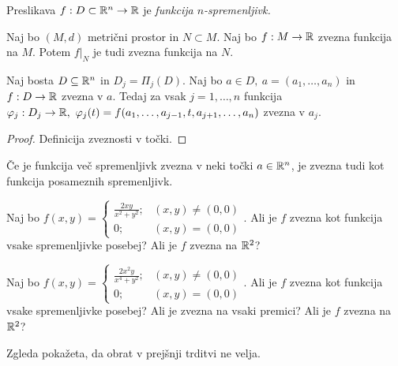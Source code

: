 \begin{definicija}
    Preslikava $f: D \subset \mathbb{R}^n \to \mathbb{R}$ je \emph{funkcija $n$-spremenljivk.}
\end{definicija}

\begin{opomba}
    Naj bo $(M, d)$ metrični prostor in $N \subset M$. Naj bo $f: M \to \mathbb{R}$ zvezna funkcija na $M$. Potem $f|_N$ je tudi zvezna funkcija na $N$.
\end{opomba}

\begin{trditev}
    Naj bosta $D \subseteq \mathbb{R}^n$ in $D_j = \Pi_j(D)$. Naj bo $a \in D, \ a =(a_1, \ldots, a_n)$ in $f: D \to \mathbb{R}$ zvezna v $a$. Tedaj za vsak $j = 1, \ldots, n$ funkcija $\varphi_j: D_j \to \R, \ \varphi_j(t) = f(a_1, \ldots, a_{j-1}, t, a_{j+1}, \ldots, a_n)$ zvezna v $a_j$.
\end{trditev}

\begin{proof}
    Definicija zveznosti v točki.
\end{proof}

\begin{opomba}
    Če je funkcija več spremenljivk zvezna v neki točki $a \in \mathbb{R}^n$, je zvezna tudi kot funkcija posameznih spremenljivk.
\end{opomba}

\begin{zgled}
    Naj bo $f(x,y) = \begin{cases}
        \frac{2xy}{x^2+y^2}; &(x,y) \neq (0,0) \\
        0; &(x,y) = (0,0)
    \end{cases}$. Ali je $f$ zvezna kot funkcija vsake spremenljivke posebej? Ali je $f$ zvezna na $\mathbb{R}^2$?
\end{zgled}

\begin{zgled}
    Naj bo $f(x,y) = \begin{cases}
        \frac{2x^2y}{x^4+y^2}; &(x,y) \neq (0,0) \\
        0; &(x,y) = (0,0)
    \end{cases}$. Ali je $f$ zvezna kot funkcija vsake spremenljivke posebej? Ali je zvezna na vsaki premici? Ali je $f$ zvezna na $\mathbb{R}^2$?
\end{zgled}

\begin{opomba}
    Zgleda pokažeta, da obrat v prejšnji trditvi ne velja.
\end{opomba}

